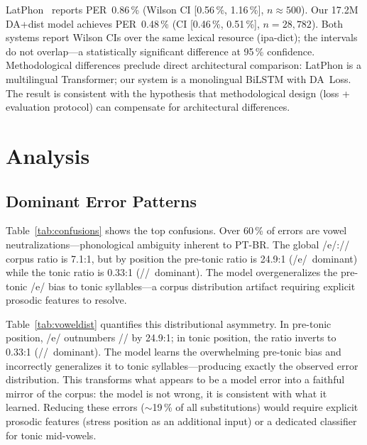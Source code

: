 \documentclass[conference]{IEEEtran}
\begin{document}
LatPhon~\cite{chary2025latphon} reports PER~0.86\,\%
(Wilson CI [0.56\,\%, 1.16\,\%], $n\!\approx\!500$).
Our 17.2M DA+dist model achieves PER~0.48\,\%
(CI [0.46\,\%, 0.51\,\%], $n\!=\!28{,}782$).
Both systems report Wilson CIs over the same lexical resource
(ipa-dict); the intervals do not overlap---a statistically
significant difference at 95\,\% confidence.
Methodological differences preclude direct architectural comparison:
LatPhon is a multilingual Transformer; our system is a monolingual
BiLSTM with DA~Loss.
The result is consistent with the hypothesis that methodological
design (loss + evaluation protocol) can compensate for architectural
differences.

\section{Analysis}
\label{sec:analysis}

\subsection{Dominant Error Patterns}

Table~\ref{tab:confusions} shows the top confusions.
Over 60\,\% of errors are vowel neutralizations---phonological
ambiguity inherent to PT-BR.
The global /e/:// corpus ratio is 7.1:1, but by position
the pre-tonic ratio is 24.9:1 (/e/~dominant) while the tonic ratio
is 0.33:1 (//~dominant).
The model overgeneralizes the pre-tonic /e/ bias to tonic
syllables---a corpus distribution artifact requiring explicit
prosodic features to resolve.

Table~\ref{tab:voweldist} quantifies this distributional asymmetry.
In pre-tonic position, /e/ outnumbers // by 24.9:1; in
tonic position, the ratio inverts to 0.33:1 (//~dominant).
The model learns the overwhelming pre-tonic bias and incorrectly
generalizes it to tonic syllables---producing exactly the observed
error distribution.
This transforms what appears to be a model error into a faithful
mirror of the corpus: the model is not wrong, it is consistent with
what it learned.
Reducing these errors ($\sim$19\,\% of all substitutions) would
require explicit prosodic features (stress position as an additional
input) or a dedicated classifier for tonic mid-vowels.
\end{document}
